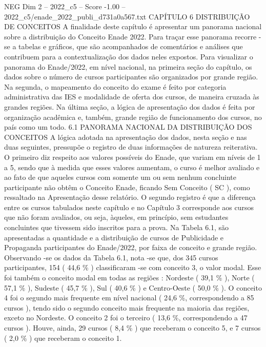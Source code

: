 \begin{textsample}{NEG Dim 2 – 2022\_c5 – Score -1.00 – 2022\_c5/enade\_2022\_publi\_d731a0a567.txt}  \label{ex:f2_neg_213}
CAPÍTULO 6 DISTRIBUIÇÃO DE CONCEITOS A finalidade deste capítulo é apresentar um panorama nacional sobre a distribuição do Conceito Enade 2022.
Para traçar esse panorama recorre -se a tabelas e gráficos, que são acompanhados de comentários e análises que contribuem para a contextualização dos dados neles expostos.
Para visualizar o panorama do Enade/2022, em nível nacional, na primeira seção do capítulo, os dados sobre o número de cursos participantes são organizados por grande região.
Na segunda, o mapeamento do conceito do exame é feito por categoria administrativa das IES e modalidade de oferta dos cursos, de maneira cruzada às grandes regiões.
Na última seção, a lógica de apresentação dos dados é feita por organização acadêmica e, também, grande região de funcionamento dos cursos, no país como um todo. 6.1 PANORAMA NACIONAL DA DISTRIBUIÇÃO DOS CONCEITOS A lógica adotada na apresentação dos dados, nesta seção e nas duas seguintes, pressupõe o registro de duas informações de natureza reiterativa.
O primeiro diz respeito aos valores possíveis do Enade, que variam em níveis de 1 a 5, sendo que à medida que esses valores aumentam, o curso é melhor avaliado e ao fato de que aqueles cursos com somente um ou sem nenhum concluinte participante não obtêm o Conceito Enade, ficando Sem Conceito ( SC ), como ressaltado na Apresentação desse relatório.
O segundo registro é que a diferença entre os cursos tabulados neste capítulo e no Capítulo 3 corresponde aos cursos que não foram avaliados, ou seja, àqueles, em princípio, sem estudantes concluintes que tivessem sido inscritos para a prova.
Na Tabela 6.1, são apresentadas a quantidade e a distribuição de cursos de Publicidade e Propaganda participantes do Enade/2022, por faixa de conceito e grande região.
Observando -se os dados da Tabela 6.1, nota -se que, dos 345 cursos participantes, 154 ( 44,6 \% ) classificaram -se com conceito 3, o valor modal.
Esse foi também o conceito modal em todas as regiões : Nordeste ( 39,1 \% ), Norte ( 57,1 \% ), Sudeste ( 45,7 \% ), Sul ( 40,6 \% ) e Centro-Oeste ( 50,0 \% ).
O conceito 4 foi o segundo mais frequente em nível nacional ( 24,6 \%, correspondendo a 85 cursos ), tendo sido o segundo conceito mais frequente na maioria das regiões, exceto no Nordeste.
O conceito 2 foi o terceiro ( 13,6 \%, correspondendo a 47 cursos ).
Houve, ainda, 29 cursos ( 8,4 \% ) que receberam o conceito 5, e 7 cursos ( 2,0 \% ) que receberam o conceito 1.

\end{textsample}
